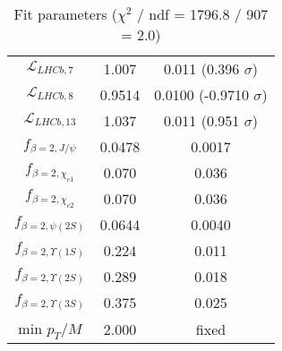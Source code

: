 \begin{table}[h!]
\begin{tabular}{c|c|c}
$\mathcal L_{LHCb,7}$ & 1.007 & 0.011 (0.396 $\sigma$) \\
$\mathcal L_{LHCb,8}$ & 0.9514 & 0.0100 (-0.9710 $\sigma$) \\
$\mathcal L_{LHCb,13}$ & 1.037 & 0.011 (0.951 $\sigma$) \\
$f_{\beta=2,J/\psi}$ & 0.0478 & 0.0017 \\
$f_{\beta=2,\chi_{c1}}$ & 0.070 & 0.036 \\
$f_{\beta=2,\chi_{c2}}$ & 0.070 & 0.036 \\
$f_{\beta=2,\psi(2S)}$ & 0.0644 & 0.0040 \\
$f_{\beta=2,\Upsilon(1S)}$ & 0.224 & 0.011 \\
$f_{\beta=2,\Upsilon(2S)}$ & 0.289 & 0.018 \\
$f_{\beta=2,\Upsilon(3S)}$ & 0.375 & 0.025 \\
min $p_T/M$ & 2.000 & fixed \\
\end{tabular}
\caption{Fit parameters ($\chi^2$ / ndf = 1796.8 / 907 = 2.0)}
\end{table}
